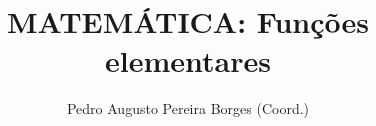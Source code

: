 \documentclass[12pt]{book}
\title{MATEMÁTICA: Funções elementares}
\author{Pedro Augusto Pereira Borges (Coord.)}
\date{\now}
\theoremstyle{definition}
\begin{document}
\begin{titlepage}
    
\end{titlepage}



\tableofcontents
\clearpage






















\end{document}
